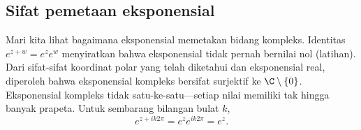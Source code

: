 
\subsection{Sifat pemetaan eksponensial}

Mari kita lihat bagaimana eksponensial memetakan bidang kompleks.
Identitas $e^{z+w} = e^z e^w$ menyiratkan bahwa eksponensial
tidak pernah bernilai nol (latihan).
Dari sifat-sifat koordinat polar yang telah diketahui
dan eksponensial real, diperoleh bahwa eksponensial kompleks bersifat
surjektif ke $\C \setminus \{ 0 \}$.
Eksponensial kompleks tidak satu-ke-satu---setiap nilai memiliki
tak hingga banyak prapeta. Untuk sembarang bilangan bulat $k$,
\begin{equation} \label{eq:exponentialidentities}
e^{z+ik2\pi} =
e^{z} e^{ik2\pi} =
e^z .
\end{equation}

